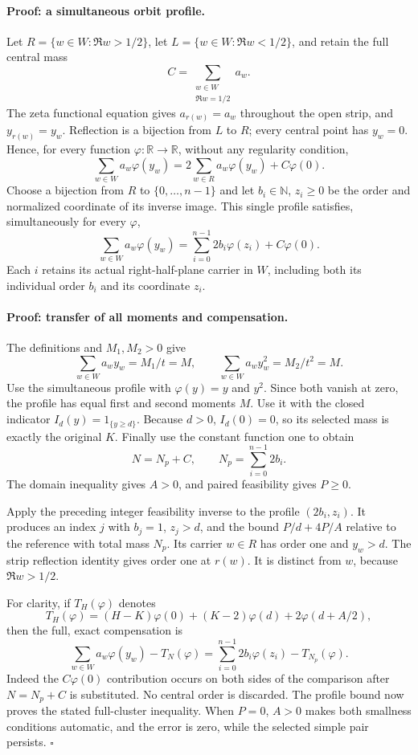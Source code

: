 \paragraph{Proof: a simultaneous orbit profile.}
Let \(R=\{w\in W:\Re w>1/2\}\), let
\(L=\{w\in W:\Re w<1/2\}\), and retain the full central mass
\[
 C=\sum_{\substack{w\in W\\\Re w=1/2}}a_w.
\]
The zeta functional equation gives \(a_{r(w)}=a_w\) throughout the open
strip, and \(y_{r(w)}=y_w\).  Reflection is a bijection from \(L\) to
\(R\); every central point has \(y_w=0\).  Hence, for every function
\(\varphi:\mathbb R\to\mathbb R\), without any regularity condition,
\[
 \sum_{w\in W}a_w\varphi(y_w)
 =2\sum_{w\in R}a_w\varphi(y_w)+C\varphi(0).
\]
Choose a bijection from \(R\) to \(\{0,\ldots,n-1\}\) and let
\(b_i\in\mathbb N\), \(z_i\ge0\) be the order and normalized coordinate
of its inverse image.  This single profile satisfies, simultaneously for
every \(\varphi\),
\[
 \sum_{w\in W}a_w\varphi(y_w)
 =\sum_{i=0}^{n-1}2b_i\varphi(z_i)+C\varphi(0).
\]
Each \(i\) retains its actual right-half-plane carrier in \(W\), including
both its individual order \(b_i\) and its coordinate \(z_i\).

\paragraph{Proof: transfer of all moments and compensation.}
The definitions and \(M_1,M_2>0\) give
\[
 \sum_{w\in W}a_wy_w=M_1/t=M,\qquad
 \sum_{w\in W}a_wy_w^2=M_2/t^2=M.
\]
Use the simultaneous profile with \(\varphi(y)=y\) and \(y^2\).
Since both vanish at zero, the profile has equal first and second
moments \(M\).  Use it with the closed indicator
\(I_d(y)=1_{\{y\ge d\}}\).  Because \(d>0\), \(I_d(0)=0\), so its
selected mass is exactly the original \(K\).  Finally use the constant
function one to obtain
\[
 N=N_p+C,\qquad N_p=\sum_{i=0}^{n-1}2b_i.
\]
The domain inequality gives \(A>0\), and paired feasibility gives \(P\ge0\).

Apply the preceding integer feasibility inverse to the profile
\((2b_i,z_i)\).  It produces an index \(j\) with \(b_j=1\), \(z_j>d\),
and the bound \(P/d+4P/A\) relative to the reference with total mass
\(N_p\).  Its carrier \(w\in R\) has order one and \(y_w>d\).
The strip reflection identity gives order one at \(r(w)\).
It is distinct from \(w\), because \(\Re w>1/2\).

For clarity, if \(T_H(\varphi)\) denotes
\[
 T_H(\varphi)=(H-K)\varphi(0)+(K-2)\varphi(d)
                  +2\varphi(d+A/2),
\]
then the full, exact compensation is
\[
 \sum_{w\in W}a_w\varphi(y_w)-T_N(\varphi)
 =\sum_{i=0}^{n-1}2b_i\varphi(z_i)-T_{N_p}(\varphi).
\]
Indeed the \(C\varphi(0)\) contribution occurs on both sides of the
comparison after \(N=N_p+C\) is substituted.  No central order is discarded.
The profile bound now proves the stated full-cluster inequality.
When \(P=0\), \(A>0\) makes both smallness conditions automatic, and
the error is zero, while the selected simple pair persists.
\hfill\(\square\)

